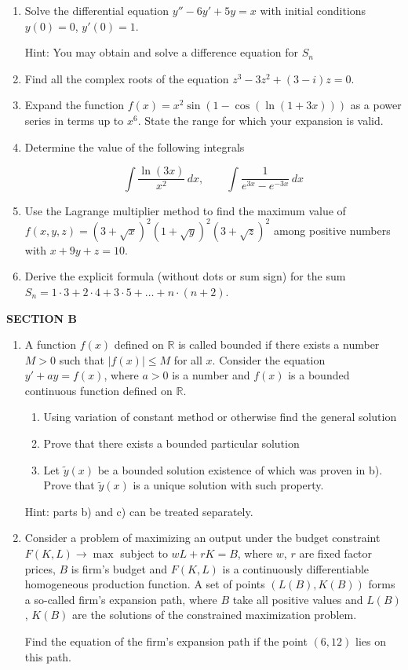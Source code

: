 \documentclass[12pt]{article}
\begin{document}
\begin{enumerate}
\item Solve the differential equation $y''-6y'+5y=x$ with initial conditions $y(0)=0$, $y'(0)=1$. 



Hint: You may obtain and solve a difference equation for $S_n$


\item Find all the complex roots of the equation $z^3-3z^2+(3-i)z=0$. 


\item Expand the function $f(x)=x^2\sin(1-\cos(\ln(1+3x)))$  as a power series in terms up to $x^6$. State the range for which your expansion is valid.

\item Determine the value of the following integrals

\[ 
\int \frac{\ln (3x)}{x^2} \, dx, \qquad \int \frac{1}{e^{3x}-e^{-3x}} \, dx
\]

\item Use the Lagrange multiplier method to find the maximum value of $f(x,y,z)=(3+\sqrt{x})^2(1+\sqrt{y})^2(3+\sqrt{z})^2$ among positive numbers with $x+9y+z=10$.


\item Derive the explicit formula (without dots or sum sign) for the sum $S_n=1\cdot 3+2\cdot 4+3\cdot 5 +\ldots+ n\cdot (n+2)$.
\end{enumerate}

\textbf{SECTION B}

\begin{enumerate}[resume]
\item A function $f(x)$ defined on $\mathbb{R}$ is called bounded if there exists a number $M>0$ such that $|f(x)| \leq M$ for all $x$. Consider the equation $y'+ ay = f (x)$, where $a>0$ is a number and $f (x)$  is a bounded continuous function defined on $\mathbb{R}$.
\begin{enumerate}
\item Using variation of constant method or otherwise find the general solution 
\item  Prove that there exists a bounded particular solution 
\item Let $\tilde{y}(x)$  be a bounded solution existence of which was proven in b). Prove that $\tilde{y}(x)$ is a unique solution with such property. 
\end{enumerate}
Hint: parts b) and c) can be treated separately.


\item Consider a problem of maximizing an output under the budget constraint $F(K,L) \to \max$ subject to $wL+rK=B$, where $w$, $r$ are fixed factor prices, $B$ is firm's budget and $F(K,L)$ is a continuously differentiable homogeneous production function. A set of points $(L(B),K(B))$ forms a so-called firm's expansion path, where $B$ take all positive values and $L(B)$, $K(B)$ are the solutions of the constrained maximization problem.

Find the equation of the firm's expansion path if the point $(6,12)$ lies on this path.
\end{enumerate}
\end{document}
